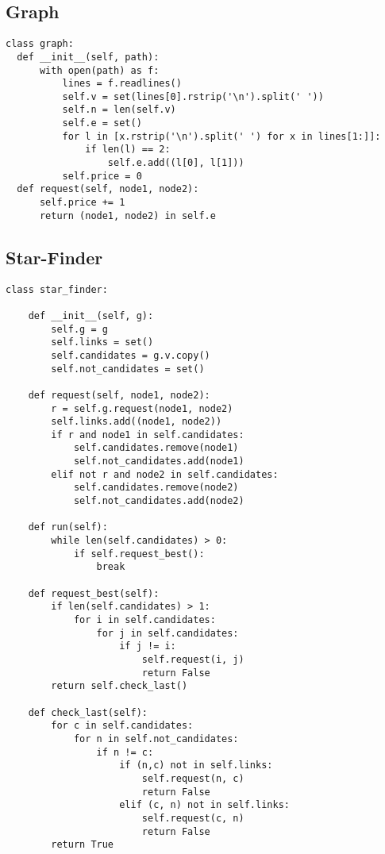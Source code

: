 \documentclass[a4paper,10pt,ngerman]{scrartcl}
\begin{document}
\subsection{Graph}
\begin{lstlisting}[frame=single]
class graph:
  def __init__(self, path):                           
      with open(path) as f:                           
          lines = f.readlines()                      
          self.v = set(lines[0].rstrip('\n').split(' ')) 
          self.n = len(self.v)                        
          self.e = set()                             
          for l in [x.rstrip('\n').split(' ') for x in lines[1:]]:
              if len(l) == 2:
                  self.e.add((l[0], l[1]))            
          self.price = 0                             
  def request(self, node1, node2):                  
      self.price += 1    
      return (node1, node2) in self.e    
\end{lstlisting}
\subsection{Star-Finder}
\begin{lstlisting}[frame=single]
class star_finder:                                      

    def __init__(self, g):                              
        self.g = g                                     
        self.links = set()                            
        self.candidates = g.v.copy()
        self.not_candidates = set() 

    def request(self, node1, node2):             
        r = self.g.request(node1, node2)        
        self.links.add((node1, node2))         
        if r and node1 in self.candidates:       
            self.candidates.remove(node1)        
            self.not_candidates.add(node1)      
        elif not r and node2 in self.candidates:      
            self.candidates.remove(node2)            
            self.not_candidates.add(node2)

    def run(self):
        while len(self.candidates) > 0:             
            if self.request_best():                
                break

    def request_best(self):  
        if len(self.candidates) > 1:              
            for i in self.candidates:            
                for j in self.candidates:       
                    if j != i:                 
                        self.request(i, j)    
                        return False         
        return self.check_last()            

    def check_last(self):
        for c in self.candidates:
            for n in self.not_candidates:  
                if n != c:                
                    if (n,c) not in self.links:
                        self.request(n, c)
                        return False
                    elif (c, n) not in self.links:
                        self.request(c, n)
                        return False
        return True                            
\end{lstlisting}
\end{document}
